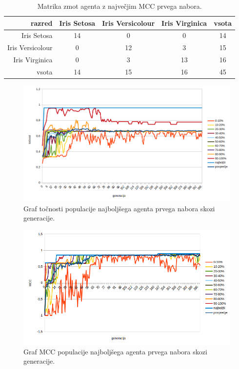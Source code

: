 \begin{table}[H]
    \centering
    \caption{Matrika zmot agenta z največjim MCC prvega nabora.}
    \begin{tabular}{||rcccc||}
        \hline
        razred           & Iris Setosa & Iris Versicolour & Iris Virginica & vsota \\ \hline
        Iris Setosa      & 14          & 0                & 0              & 14    \\ \hline
        Iris Versicolour & 0           & 12               & 3              & 15    \\ \hline
        Iris Virginica   & 0           & 3                & 13             & 16    \\ \hline
        vsota            & 14          & 15               & 16             & 45    \\ \hline
    \end{tabular}
    \label{tab:iris_mcc_1}
\end{table}

\begin{figure}[H]
    \begin{center}
        \includegraphics[width=13cm]{iris/1/acc}
    \end{center}
    \caption{Graf točnosti populacije najboljšega agenta prvega nabora skozi generacije.}
    \label{fig:iris_acc_1}
\end{figure}

\begin{figure}[H]
    \begin{center}
        \includegraphics[width=13cm]{iris/1/mcc}
    \end{center}
    \caption{Graf MCC populacije najboljšega agenta prvega nabora skozi generacije.}
    \label{fig:iris_mcc_1}
\end{figure}

